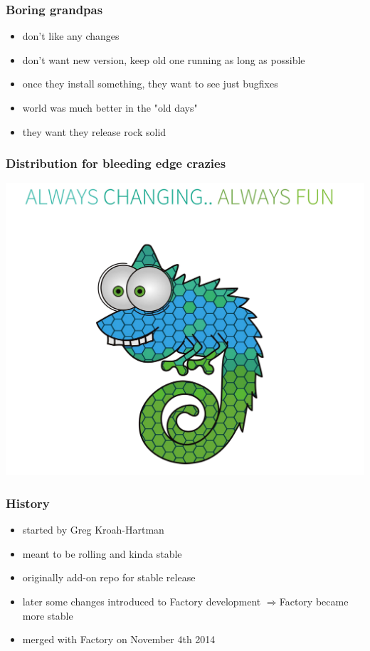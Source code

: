 \documentclass{beamer}
\begin{document}
\begin{frame}[t]
\frametitle{Boring grandpas}
\begin{itemize}
\item don't like any changes
\item don't want new version, keep old one running as long as possible
\item once they install something, they want to see just bugfixes
\item world was much better in the "old days"
\item they want they release rock solid
\end{itemize}
\end{frame}


\begin{frame}[t]
\frametitle{Distribution for bleeding edge crazies}
\begin{center}
\includegraphics[height=.7\paperheight]{always-changing}
\end{center}
\end{frame}

\begin{frame}[t]
\frametitle{History}
\begin{itemize}
\item started by Greg Kroah-Hartman
\item meant to be rolling and kinda stable
\item originally add-on repo for stable release
\item later some changes introduced to Factory development\newline
\hspace{1cm}\(\Rightarrow\)Factory became more stable
\item merged with Factory on November 4th 2014
\end{itemize}
\end{frame}
\end{document}
